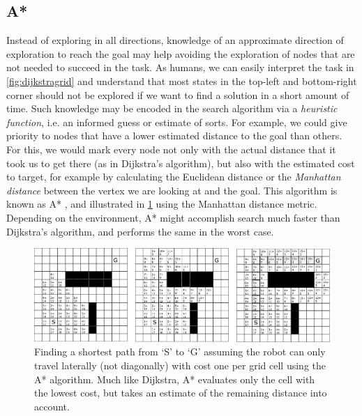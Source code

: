 \subsection{A*}\label{sec:astar}

Instead of exploring in all directions, knowledge of an approximate direction of exploration to reach the goal may help avoiding the exploration of nodes that are not needed to succeed in the task.
As humans, we can easily interpret the task in \cref{fig:dijkstragrid} and understand that most states in the top-left and bottom-right corner should not be explored if we want to find a solution in a short amount of time.
Such knowledge may be encoded in the search algorithm via a \textsl{heuristic function}, i.e. an informed guess or estimate of sorts. For example, we could give priority to nodes that have a lower estimated distance to the goal than others.
For this, we would mark every node not only with the actual distance that it took us to get there (as in Dijkstra's algorithm), but also with the estimated cost to target, for example by calculating the Euclidean distance or the \textsl{Manhattan distance} between the vertex we are looking at and the goal.
This algorithm is known as A* \cite{hart1968formal}, and illustrated in \cref{fig:astargrid} using the Manhattan distance metric. Depending on the environment, A* might accomplish search much faster than Dijkstra's algorithm, and performs the same in the worst case.


\begin{figure}[htb]
    \centering
    \includegraphics[width=\textwidth]{figs/astargrid.pdf}
    \caption{Finding a shortest path from `S' to `G' assuming the robot can only travel laterally (not diagonally) with cost one per grid cell using the A* algorithm. Much like Dijkstra, A* evaluates only the cell with the lowest cost, but takes an estimate of the remaining distance into account.\label{fig:astargrid}}
\end{figure}

